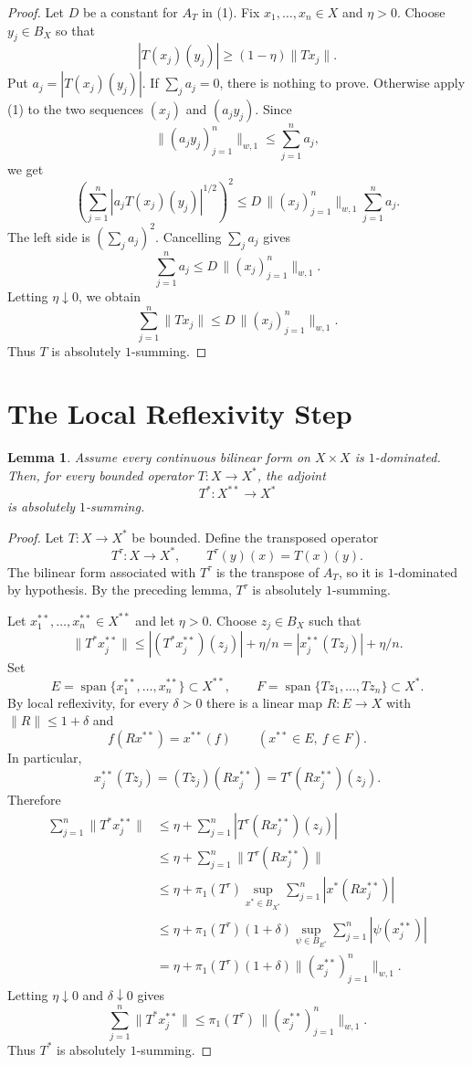 \documentclass[11pt]{article}
\newtheorem{lemma}{Lemma}
\begin{document}
\begin{proof}
Let \(D\) be a constant for \(A_T\) in (1). Fix \(x_1,\ldots,x_n\in X\) and
\(\eta>0\). Choose \(y_j\in B_X\) so that
\[
  |T(x_j)(y_j)|\ge (1-\eta)\|T x_j\|.
\]
Put \(a_j=|T(x_j)(y_j)|\). If \(\sum_j a_j=0\), there is nothing to prove.
Otherwise apply (1) to the two sequences \((x_j)\) and \((a_j y_j)\). Since
\[
  \|(a_j y_j)_{j=1}^n\|_{w,1}
  \le \sum_{j=1}^n a_j,
\]
we get
\[
\left(\sum_{j=1}^n |a_j T(x_j)(y_j)|^{1/2}\right)^2
\le
D\,\|(x_j)_{j=1}^n\|_{w,1}\sum_{j=1}^n a_j .
\]
The left side is \((\sum_j a_j)^2\). Cancelling \(\sum_j a_j\) gives
\[
  \sum_{j=1}^n a_j
  \le D\,\|(x_j)_{j=1}^n\|_{w,1}.
\]
Letting \(\eta\downarrow0\), we obtain
\[
  \sum_{j=1}^n \|T x_j\|
  \le D\,\|(x_j)_{j=1}^n\|_{w,1}.
\]
Thus \(T\) is absolutely \(1\)-summing.
\end{proof}

\section*{The Local Reflexivity Step}

\begin{lemma}
Assume every continuous bilinear form on \(X\times X\) is \(1\)-dominated.
Then, for every bounded operator \(T:X\to X^*\), the adjoint
\[
T^*:X^{**}\to X^*
\]
is absolutely \(1\)-summing.
\end{lemma}

\begin{proof}
Let \(T:X\to X^*\) be bounded. Define the transposed operator
\[
  T^\tau:X\to X^*,\qquad T^\tau(y)(x)=T(x)(y).
\]
The bilinear form associated with \(T^\tau\) is the transpose of \(A_T\), so it
is \(1\)-dominated by hypothesis. By the preceding lemma, \(T^\tau\) is
absolutely \(1\)-summing.

Let \(x_1^{**},\ldots,x_n^{**}\in X^{**}\) and let \(\eta>0\). Choose
\(z_j\in B_X\) such that
\[
  \|T^*x_j^{**}\|
  \le |(T^*x_j^{**})(z_j)|+\eta/n
  = |x_j^{**}(Tz_j)|+\eta/n .
\]
Set
\[
  E=\operatorname{span}\{x_1^{**},\ldots,x_n^{**}\}\subset X^{**},
  \qquad
  F=\operatorname{span}\{Tz_1,\ldots,Tz_n\}\subset X^* .
\]
By local reflexivity, for every \(\delta>0\) there is a linear map
\(R:E\to X\) with \(\|R\|\le1+\delta\) and
\[
  f(Rx^{**})=x^{**}(f)\qquad(x^{**}\in E,\ f\in F).
\]
In particular,
\[
  x_j^{**}(Tz_j)=(Tz_j)(Rx_j^{**})
  =T^\tau(Rx_j^{**})(z_j).
\]
Therefore
\begin{align*}
\sum_{j=1}^n \|T^*x_j^{**}\|
&\le
\eta+\sum_{j=1}^n |T^\tau(Rx_j^{**})(z_j)|\\
&\le
\eta+\sum_{j=1}^n \|T^\tau(Rx_j^{**})\|\\
&\le
\eta+\pi_1(T^\tau)
  \sup_{x^*\in B_{X^*}}\sum_{j=1}^n |x^*(Rx_j^{**})|\\
&\le
\eta+\pi_1(T^\tau)(1+\delta)
  \sup_{\psi\in B_{E^*}}\sum_{j=1}^n |\psi(x_j^{**})|\\
&=
\eta+\pi_1(T^\tau)(1+\delta)
  \|(x_j^{**})_{j=1}^n\|_{w,1}.
\end{align*}
Letting \(\eta\downarrow0\) and \(\delta\downarrow0\) gives
\[
  \sum_{j=1}^n \|T^*x_j^{**}\|
  \le
  \pi_1(T^\tau)\,\|(x_j^{**})_{j=1}^n\|_{w,1}.
\]
Thus \(T^*\) is absolutely \(1\)-summing.
\end{proof}
\end{document}
